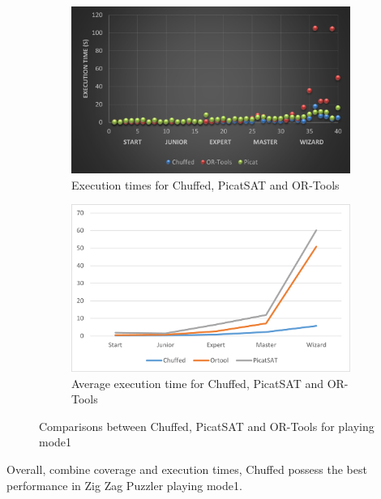 \begin{figure}[htbp]
    \centering
    \begin{subfigure}[b]{0.48\textwidth}
     \includegraphics[width=\textwidth]{figs/time1three.png}
    \caption{Execution times for Chuffed, PicatSAT and OR-Tools}
    \label{fig:time1three}
    \end{subfigure}
    \begin{subfigure}[b]{0.48\textwidth}
     \includegraphics[width=\textwidth]{figs/mode1solverscomparison.png}
    \caption{Average execution time for Chuffed, PicatSAT and OR-Tools}
    \label{fig:time1threeslope}
    \end{subfigure}
    \caption{Comparisons between Chuffed, PicatSAT and OR-Tools for playing mode1}
\end{figure}
Overall, combine coverage and execution times, Chuffed possess the best performance in Zig Zag Puzzler playing mode1.
